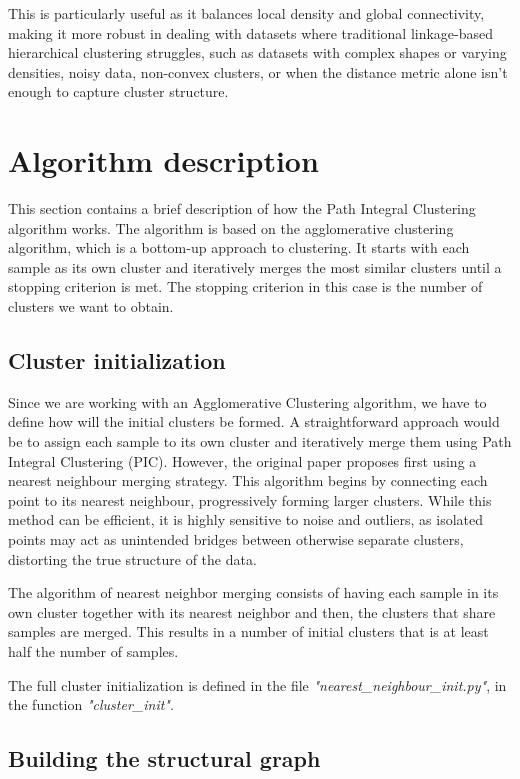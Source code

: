 \documentclass[
	10pt,
	parskip=half-,	
	paper=a4,
	english
	]{scrartcl}
\begin{document}
This is particularly useful as it balances local density and global connectivity, making it more robust in dealing with datasets where traditional linkage-based hierarchical clustering struggles, such as datasets with complex shapes or varying densities, noisy data, non-convex clusters, or when the distance metric alone isn't enough to capture cluster structure.

\section{Algorithm description}

This section contains a brief description of how the Path Integral Clustering algorithm works. The algorithm is based on the agglomerative clustering algorithm, which is a bottom-up approach to clustering. It starts with each sample as its own cluster and iteratively merges the most similar clusters until a stopping criterion is met. The stopping criterion in this case is the number of clusters we want to obtain.

\subsection{Cluster initialization}

Since we are working with an Agglomerative Clustering algorithm, we have to define how will the initial clusters be formed. A straightforward approach would be to assign each sample to its own cluster and iteratively merge them using Path Integral Clustering (PIC). However, the original paper proposes first using a nearest neighbour merging strategy. This algorithm begins by connecting each point to its nearest neighbour, progressively forming larger clusters. While this method can be efficient, it is highly sensitive to noise and outliers, as isolated points may act as unintended bridges between otherwise separate clusters, distorting the true structure of the data.

The algorithm of nearest neighbor merging consists of having each sample in its own cluster together with its nearest neighbor and then, the clusters that share samples are merged. This results in a number of initial clusters that is at least half the number of samples.

The full cluster initialization is defined in the file \textit{"nearest\_neighbour\_init.py"}, in the function \textit{"cluster\_init"}.

\subsection{Building the structural graph}
\end{document}

